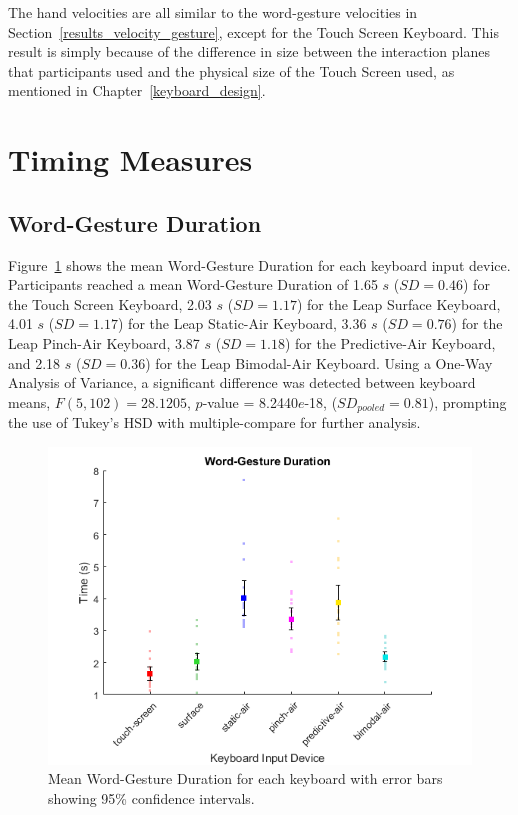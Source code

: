The hand velocities are all similar to the word-gesture velocities in Section~\ref{results_velocity_gesture}, except for the Touch Screen Keyboard. This result is simply because of the difference in size between the interaction planes that participants used and the physical size of the Touch Screen used, as mentioned in Chapter~\ref{keyboard_design}.

\section{Timing Measures}

\subsection{Word-Gesture Duration}
Figure~\ref{fig_time_mean} shows the mean Word-Gesture Duration for each keyboard input device. Participants reached a mean Word-Gesture Duration of 1.65 $s$ ($SD = 0.46$) for the Touch Screen Keyboard, 2.03 $s$ ($SD = 1.17$) for the Leap Surface Keyboard, 4.01 $s$ ($SD = 1.17$) for the Leap Static-Air Keyboard, 3.36 $s$ ($SD = 0.76$) for the Leap Pinch-Air Keyboard, 3.87 $s$ ($SD = 1.18$) for the Predictive-Air Keyboard, and 2.18 $s$ ($SD = 0.36$) for the Leap Bimodal-Air Keyboard. Using a One-Way Analysis of Variance, a significant difference was detected between keyboard means, $F(5, 102) = 28.1205$, $p$-value = 8.2440$e$-18, ($SD_{pooled} = 0.81$), prompting the use of Tukey's HSD with multiple-compare for further analysis.

\begin{figure}[h]
	\centering
	\includegraphics{fig_time_mean}
	\caption[Mean Word-Gesture Duration]{Mean Word-Gesture Duration for each keyboard with error bars showing 95\% confidence intervals.}
	\label{fig_time_mean}
\end{figure}

